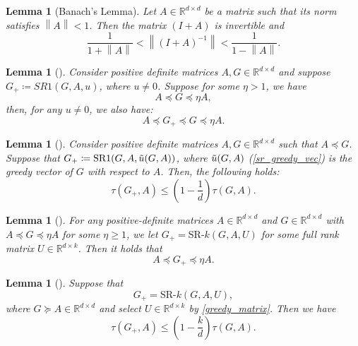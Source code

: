 \documentclass[letterpaper]{article} %
\theoremstyle{plain}
\newtheorem{lemma}[theorem]{Lemma}
\theoremstyle{definition}
\theoremstyle{remark}
\newcommand\norm[1]{\left\lVert#1\right\rVert}
\def\BR{{\mathbb{R}}}
\begin{document}
\begin{lemma}[Banach's Lemma]
    Let $A \in \BR^{d \times d}$ be a matrix such that its norm satisfies $\norm{A} < 1$. Then the matrix $(I + A)$ is invertible and 
    \begin{equation*}
        \frac{1}{1 + \norm{A}} < \norm{(I + A)^{-1}} < \frac{1}{1 - \norm{A}}. 
    \end{equation*}
    \label{lemma:banach}
\end{lemma}
\begin{lemma}[\citet{ye2021explicit}]
    Consider positive definite matrices $A, G \in \BR^{d \times d}$ and suppose $G_{+} \coloneqq SR1(G, A, u)$, where $u \neq 0$. Suppose for some $\eta > 1$, we have
    \begin{equation*}
        A \preceq G \preceq \eta A,
    \end{equation*}
    then, for any $u \neq 0$, we also have:
    \begin{equation*}
        A \preceq G_{+} \preceq G \preceq \eta A.
    \end{equation*}
    \label{lemma:sr1_one_step}
\end{lemma}
\begin{lemma}[\citet{lin2022explicit}]
    Consider positive definite matrices $A, G \in \BR^{d \times d}$ such that $A \preceq G$. Suppose that $G_{+} \coloneqq \textrm{SR1}(G, A, \Tilde{u}(G, A))$, where $\Tilde{u}(G, A)$  (\eqref{sr_greedy_vec}) is the greedy vector of $G$ with respect to $A$. Then, the following holds:
    \begin{equation*}
        \tau(G_{+}, A) \leq \left(1 - \frac{1}{d}\right) \tau(G, A).
    \end{equation*}
    \label{lemma:sr1_one_step_2}
\end{lemma}
\begin{lemma}[\citet{liu2023symmetric}]
    For any positive-definite matrices $A \in \BR^{d \times d}$ and $G \in \BR^{d \times d}$ with $A \preceq G \preceq \eta A$ for some $\eta \geq 1$, we let $G_{+} = \mathrm{SR}\textrm{-}k(G, A, U)$ for some full rank matrix $U \in \BR^{d\times k}$.
    Then it holds that
    \begin{equation}
        A \preceq G_{+} \preceq \eta A.
    \end{equation}
    \label{lemma:srk_update_consist}
\end{lemma}
\begin{lemma}[\citet{liu2023symmetric}]
    Suppose that 
    \begin{equation*}
        G_+ = \mathrm{SR}\textrm{-}k(G, A, U),
    \end{equation*}
    where $G \succeq A \in \BR^{d \times d}$ and select $U \in \BR^{d \times k}$ by \eqref{greedy_matrix}. Then we have
    \begin{equation}
        \tau(G_{+}, A) \leq \left( 1 - \frac{k}{d}\right) \tau(G, A).
    \end{equation}
    \label{lemma:srk_one_step}
\end{lemma}
\end{document}
